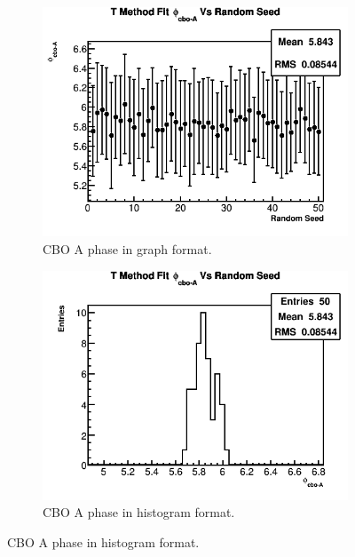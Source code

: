 \begin{figure}[]
	   	\vspace{4mm}
	    \begin{subfigure}[t]{0.45\textwidth}
		    \centering
			\includegraphics[width=\textwidth]{TMethod_phi_cbo-A_Vs_Iter_Canv}
		    \caption{CBO A phase in graph format.}
	    \end{subfigure}
	    \hspace{4mm}
	    \begin{subfigure}[t]{0.45\textwidth}
		    \centering
			\includegraphics[width=\textwidth]{TMethod_phi_cbo-A_Vs_Iter_Canv_hist}
		    \caption{CBO A phase in histogram format.}
	    \end{subfigure}%
	   	\vspace{4mm}

\end{figure}
